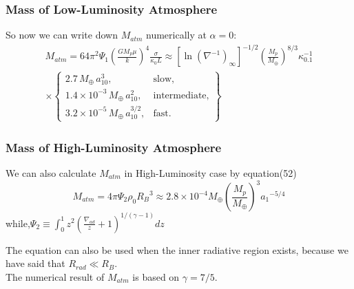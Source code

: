 \documentclass{beamer}
\begin{document}
\begin{frame}
\frametitle{Mass of Low-Luminosity Atmosphere}
So now we can write down $M_{atm}$ numerically at $\alpha=0$:
\begin{align}
\tag{57}
M_{atm} = 64 \pi^2 \Psi_1 \left( \frac{GM_p \mu}{k} \right)^4 \frac{\sigma}{\kappa_0 L} \approx \left[ \ln \left( \nabla^{-1} \right)_{\infty} \right]^{-1/2} \left( \frac{M_p}{M_{\oplus}} \right)^{8/3} \kappa_{0.1}^{-1} \\
\times \left\{ 
\tag{57}
\begin{array}{ll} 
2.7 \, M_{\oplus} \, a_{10}^3, & \text{slow,} \\ 
1.4 \times 10^{-3} \, M_{\oplus} \, a_{10}^2, & \text{intermediate,} \\ 
3.2 \times 10^{-5} \, M_{\oplus} \, a_{10}^{3/2}, & \text{fast.} 
\end{array}  
\right\}
\end{align}
\end{frame}

\begin{frame}
\frametitle{Mass of High-Luminosity Atmosphere}
We can also calculate $M_{atm}$ in High-Luminosity case by equation(52)
\begin{equation}
\tag{58}
M_{atm} = 4 \pi \Psi_2 \rho_0 {R_B}^3 \approx 2.8 \times {10}^{-4} M_{\oplus} {(\frac{M_p}{M_{\oplus}})}^3 {a_1}^{-5/4}
\end{equation}
while,$\Psi_2 \equiv \int_{0}^{1} z^2{(\frac{\nabla_{ad}}{z}+1)}^{1/(\gamma-1)} dz$

The equation can also be used when the inner radiative region exists, because we have said that $R_{rad} \ll R_B$.\\
The numerical result of $M_{atm}$ is based on $\gamma= 7/5$.
\end{frame}
\end{document}
